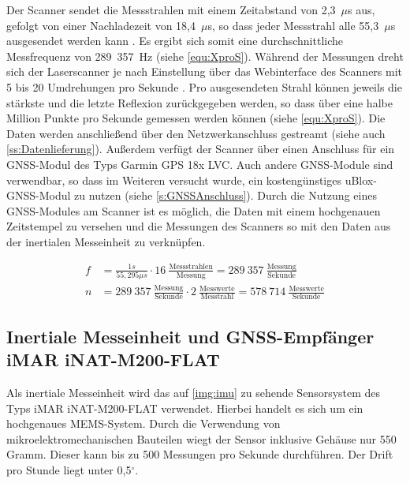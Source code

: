 \documentclass[a4paper,12pt,bibliography=totoc, listof=totoc,titlepage,pointlessnumbers]{scrreprt}
\begin{document}
Der Scanner sendet die Messstrahlen mit einem Zeitabstand von 2,3~$\mu$s aus, gefolgt von einer Nachladezeit von 18,4~$\mu$s, so dass jeder Messstrahl alle 55,3~$\mu$s ausgesendet werden kann \citep[S. 16]{vlpManual}. Es ergibt sich somit eine durchschnittliche Messfrequenz von 289~357~Hz (siehe \autoref{equ:XproS}). Während der Messungen dreht sich der Laser\-scan\-ner je nach Einstellung über das Webinterface des Scanners mit 5 bis 20 Umdrehungen pro Sekunde \citep{vlpSheet}. Pro ausgesendeten Strahl können jeweils die stärkste und die letzte Reflexion zurückgegeben werden, so dass über eine halbe Million Punkte pro Sekunde gemessen werden können (siehe \autoref{equ:XproS}). Die Daten werden anschließend über den Netzwerkanschluss gestreamt (siehe auch \autoref{ss:Datenlieferung}). Außerdem verfügt der Scanner über einen Anschluss für ein GNSS-Modul des Typs Garmin GPS 18x LVC. Auch andere GNSS-Module sind verwendbar, so dass im Weiteren versucht wurde, ein kostengünstiges uBlox-GNSS-Modul zu nutzen (siehe \autoref{s:GNSSAnschluss}). Durch die Nutzung eines GNSS-Modules am Scanner ist es möglich, die Daten mit einem hochgenauen Zeitstempel zu versehen und die Messungen des Scanners so mit den Daten aus der inertialen Messeinheit zu verknüpfen.

\begin{equation}
 \label{equ:XproS}
 \begin{aligned}
  f &= \frac{1s}{55,295\mu s} \cdot 16~\frac{\text{Messstrahlen}}{\text{Messung}} = 289~357~\frac{\text{Messung}}{\text{Sekunde}} \\
  n &= 289~357~\frac{\text{Messung}}{\text{Sekunde}} \cdot 2~\frac{\text{Messwerte}}{\text{Messtrahl}} = 578~714~\frac{\text{Messwerte}}{\text{Sekunde}}
 \end{aligned}
\end{equation}

\subsection{Inertiale Messeinheit und GNSS-Empfänger iMAR iNAT-M200-FLAT}
\label{s:iMar}
Als inertiale Messeinheit wird das auf \autoref{img:imu} zu sehende Sensorsystem des Typs iMAR iNAT-M200-FLAT verwendet. Hierbei handelt es sich um ein hochgenaues MEMS-System. Durch die Verwendung von mikroelektromechanischen Bauteilen wiegt der Sensor inklusive Gehäuse nur 550 Gramm. Dieser kann bis zu 500 Messungen pro Sekunde durchführen. Der Drift pro Stunde liegt unter 0,5\(^\circ\). \citep{imar}
\end{document}
